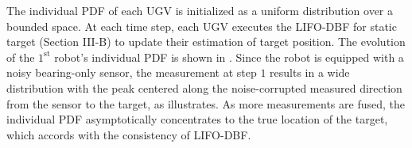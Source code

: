 \documentclass[journal]{IEEEtranTIE}
\theoremstyle{remark}
\begin{document}
The individual PDF of each UGV is initialized as a uniform distribution over a bounded space. 
At each time step, each UGV executes the LIFO-DBF for static target (Section III-B) to update their estimation of target position.
The evolution of the $1^\text{st}$ robot's individual PDF is shown in . 
Since the robot is equipped with a noisy bearing-only sensor, the measurement at step $1$ results in a wide distribution with the peak centered along the noise-corrupted measured direction from the sensor to the target, as  illustrates.
As more measurements are fused, the individual PDF asymptotically concentrates to the true location of the target, which accords with the consistency of LIFO-DBF.
\end{document}
